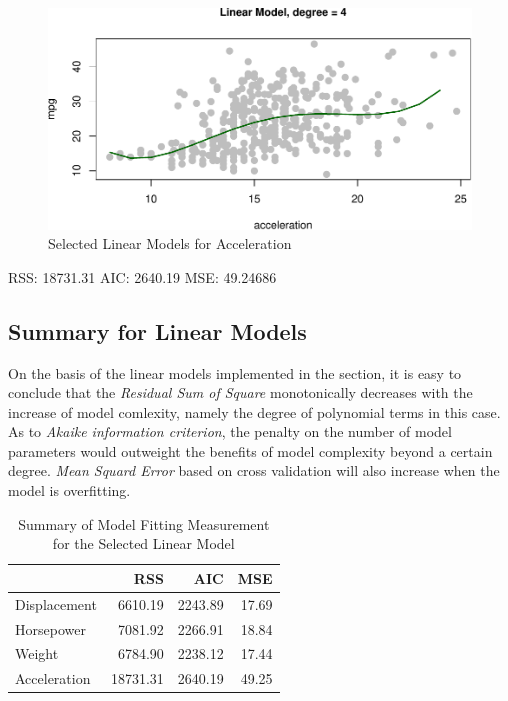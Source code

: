 \documentclass[]{article}
\begin{document}
\begin{figure}

{\centering \includegraphics{Report_files/figure-latex/lm-a-best-1} 

}

\caption{Selected Linear Models for Acceleration}\label{fig:lm-a-best}
\end{figure}

RSS: 18731.31 AIC: 2640.19 MSE: 49.24686

\hypertarget{summary-for-linear-models}{%
\subsection{Summary for Linear Models}\label{summary-for-linear-models}}

On the basis of the linear models implemented in the section, it is easy
to conclude that the \emph{Residual Sum of Square} monotonically
decreases with the increase of model comlexity, namely the degree of
polynomial terms in this case. As to \emph{Akaike information
criterion}, the penalty on the number of model parameters would
outweight the benefits of model complexity beyond a certain degree.
\emph{Mean Squard Error} based on cross validation will also increase
when the model is overfitting.

\begin{longtable}[t]{lrrr}
\caption{\label{tab:lm-sum}Summary of Model Fitting Measurement for the Selected Linear Model}\\
\toprule
  & RSS & AIC & MSE\\
\midrule
Displacement & 6610.19 & 2243.89 & 17.69\\
Horsepower & 7081.92 & 2266.91 & 18.84\\
Weight & 6784.90 & 2238.12 & 17.44\\
Acceleration & 18731.31 & 2640.19 & 49.25\\
\bottomrule
\end{longtable}
\end{document}
